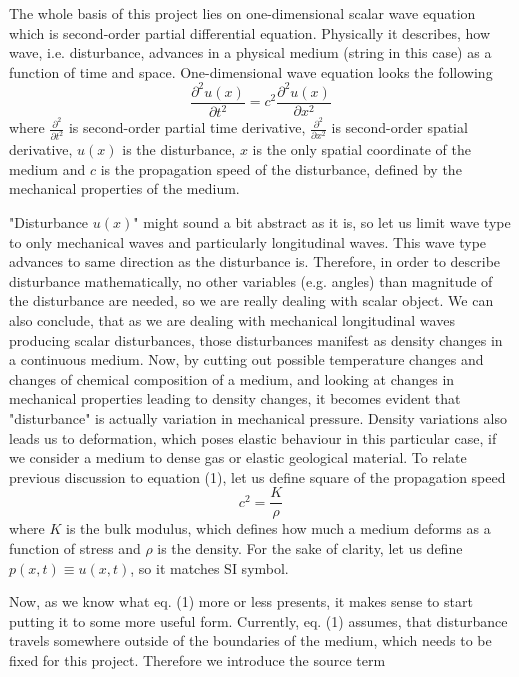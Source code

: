 \documentclass[]{article}
\begin{document}
The whole basis of this project lies on one-dimensional scalar wave equation which is second-order partial differential equation. Physically it describes, how wave, i.e. disturbance, advances in a physical medium (string in this case) as a function of time and space. One-dimensional wave equation looks the following
\begin{equation}
	\frac{\partial^2 u\left(x\right)}{\partial t^2}=c^2\frac{\partial^2 u\left(x\right)}{\partial x^2}
\end{equation} 
where $\frac{\partial^2}{\partial t^2}$ is second-order partial time derivative, $\frac{\partial^2}{\partial x^2}$ is second-order spatial derivative, $u(x)$ is the disturbance, $x$ is the only spatial coordinate of the medium and $c$ is the propagation speed of the disturbance, defined by the mechanical properties of the medium. \par
"Disturbance $u\left(x\right)$" might sound a bit abstract as it is, so let us limit wave type to only mechanical waves and particularly longitudinal waves. This wave type advances to same direction as the disturbance is. Therefore, in order to describe disturbance mathematically, no other variables (e.g. angles) than magnitude of the disturbance are needed, so we are really dealing with scalar object. We can also conclude, that as we are dealing with mechanical longitudinal waves producing scalar disturbances, those disturbances manifest as density changes in a continuous medium. Now, by cutting out possible temperature changes and changes of chemical composition of a medium, and looking at changes in mechanical properties leading to density changes, it becomes evident that "disturbance" is actually variation in mechanical pressure. Density variations also leads us to deformation, which poses elastic behaviour in this particular case, if we consider a medium to dense gas or elastic geological material. To relate previous discussion to equation (1), let us define square of the propagation speed
\begin{equation}
	c^2=\frac{K}{\rho}
\end{equation} 
where $K$ is the bulk modulus, which defines how much a medium deforms as a function of stress and $\rho$ is the density. For the sake of clarity, let us define $p\left(x,t\right)\equiv u\left(x,t\right)$, so it matches SI symbol. \par 
Now, as we know what eq. (1) more or less presents, it makes sense to start putting it to some more useful form. Currently, eq. (1) assumes, that disturbance travels somewhere outside of the boundaries of the medium, which needs to be fixed for this project. Therefore we introduce the source term
\end{document}
